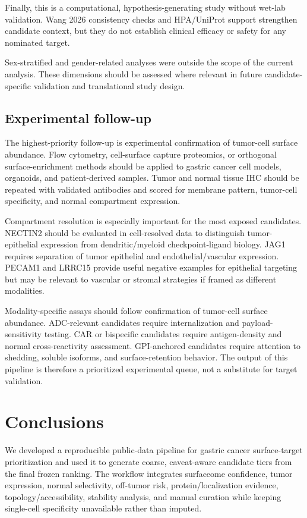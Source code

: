 \documentclass[twocolumn]{article}
\begin{document}
Finally, this is a computational, hypothesis-generating study without wet-lab validation. Wang 2026 consistency checks and HPA/\allowbreak{}UniProt support strengthen candidate context, but they do not establish clinical efficacy or safety for any nominated target.

Sex-stratified and gender-related analyses were outside the scope of the current analysis. These dimensions should be assessed where relevant in future candidate-specific validation and translational study design.

\subsection{Experimental follow-up}

The highest-priority follow-up is experimental confirmation of tumor-cell surface abundance. Flow cytometry, cell-surface capture proteomics, or orthogonal surface-enrichment methods should be applied to gastric cancer cell models, organoids, and patient-derived samples. Tumor and normal tissue IHC should be repeated with validated antibodies and scored for membrane pattern, tumor-cell specificity, and normal compartment expression.

Compartment resolution is especially important for the most exposed candidates. NECTIN2 should be evaluated in cell-resolved data to distinguish tumor-epithelial expression from dendritic/\allowbreak{}myeloid checkpoint-ligand biology. JAG1 requires separation of tumor epithelial and endothelial/\allowbreak{}vascular expression. PECAM1 and LRRC15 provide useful negative examples for epithelial targeting but may be relevant to vascular or stromal strategies if framed as different modalities.

Modality-specific assays should follow confirmation of tumor-cell surface abundance. ADC-relevant candidates require internalization and payload-sensitivity testing. CAR or bispecific candidates require antigen-density and normal cross-reactivity assessment. GPI-anchored candidates require attention to shedding, soluble isoforms, and surface-retention behavior. The output of this pipeline is therefore a prioritized experimental queue, not a substitute for target validation.

\section{Conclusions}

We developed a reproducible public-data pipeline for gastric cancer surface-target prioritization and used it to generate coarse, caveat-aware candidate tiers from the final frozen ranking. The workflow integrates surfaceome confidence, tumor expression, normal selectivity, off-tumor risk, protein/\allowbreak{}localization evidence, topology/\allowbreak{}accessibility, stability analysis, and manual curation while keeping single-cell specificity unavailable rather than imputed.
\end{document}
